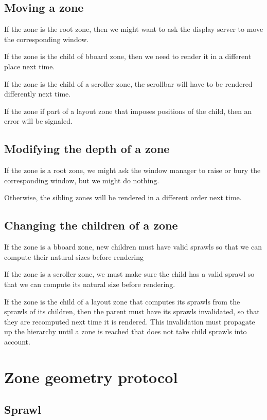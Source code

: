 \documentclass{report}
\begin{document}
\subsection{Moving a zone}

If the zone is the root zone, then we might want to ask the display
server to move the corresponding window. 

If the zone is the child of bboard zone, then we need to render it in
a different place next time. 

If the zone is the child of a scroller zone, the scrollbar will have
to be rendered differently next time. 

If the zone if part of a layout zone that imposes positions of the
child, then an error will be signaled. 

\subsection{Modifying the depth of a zone}

If the zone is a root zone, we might ask the window manager to raise
or bury the corresponding window, but we might do nothing. 

Otherwise, the sibling zones will be rendered in a different order
next time.

\subsection{Changing the children of a zone}

If the zone is a bboard zone, new children must have valid sprawls so
that we can compute their natural sizes before rendering

If the zone is a scroller zone, we must make sure the child has a
valid sprawl so that we can compute its natural size before rendering.

If the zone is the child of a layout zone that computes its sprawls from
the sprawls of its children, then the parent must have its sprawls
invalidated, so that they are recomputed next time it is rendered.
This invalidation must propagate up the hierarchy until a zone is
reached that does not take child sprawls into account. 

\section{Zone geometry protocol}

\subsection{Sprawl}
\label{sec-zone-protocols-geometry-sprawl}
\end{document}
